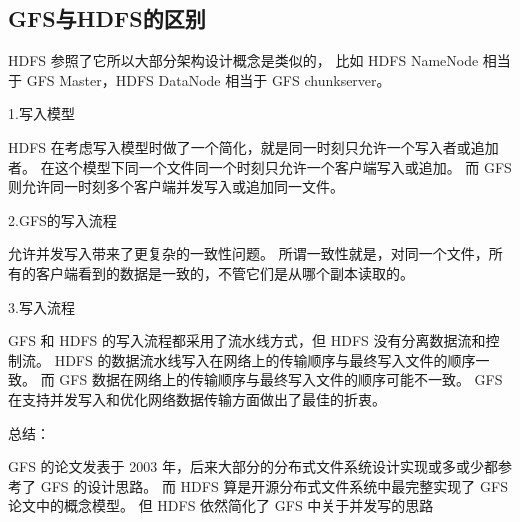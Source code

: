 \subsection{GFS与HDFS的区别}
HDFS 参照了它所以大部分架构设计概念是类似的，
比如 HDFS NameNode 相当于 GFS Master，HDFS DataNode 相当于 GFS chunkserver。

1.写入模型

HDFS 在考虑写入模型时做了一个简化，就是同一时刻只允许一个写入者或追加者。 
在这个模型下同一个文件同一个时刻只允许一个客户端写入或追加。
而 GFS 则允许同一时刻多个客户端并发写入或追加同一文件。

2.GFS的写入流程

允许并发写入带来了更复杂的一致性问题。 
所谓一致性就是，对同一个文件，所有的客户端看到的数据是一致的，不管它们是从哪个副本读取的。

3.写入流程

GFS 和 HDFS 的写入流程都采用了流水线方式，但 HDFS 没有分离数据流和控制流。
HDFS 的数据流水线写入在网络上的传输顺序与最终写入文件的顺序一致。
而 GFS 数据在网络上的传输顺序与最终写入文件的顺序可能不一致。
GFS 在支持并发写入和优化网络数据传输方面做出了最佳的折衷。

总结：

GFS 的论文发表于 2003 年，后来大部分的分布式文件系统设计实现或多或少都参考了 GFS 的设计思路。
而 HDFS 算是开源分布式文件系统中最完整实现了 GFS 论文中的概念模型。 
但 HDFS 依然简化了 GFS 中关于并发写的思路
